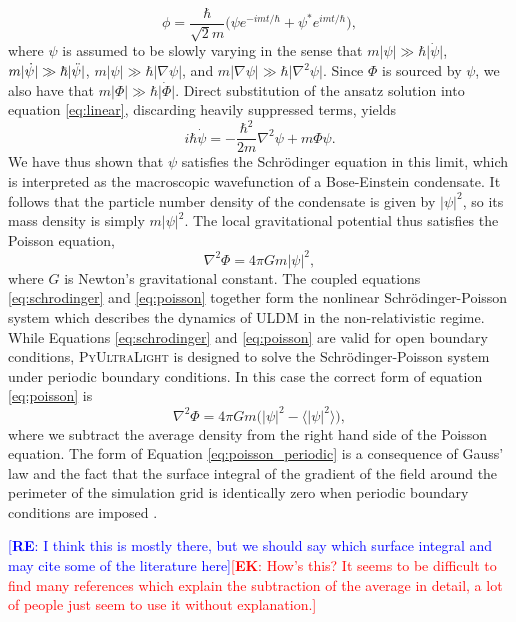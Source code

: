 \documentclass[a4paper,11pt]{article}
\newcommand{\re}[1]{\textcolor{blue}{[{\bf RE}: #1]}}
\newcommand{\ek}[1]{\textcolor{red}{[{\bf EK}: #1]}}
\newcommand{\PyUltraLight}{\textsc{PyUltraLight}\xspace}
\begin{document}
\begin{equation}\label{eq:ansatz}
    \phi=\frac{\hbar}{\sqrt{2}m}\big(\psi e^{-imt/\hbar}+\psi^* e^{imt/\hbar}\big),
\end{equation}
where $\psi$ is assumed to be slowly varying in the sense that $m\vert\psi\vert\gg\hbar\vert\dot{\psi}\vert$, $m\vert\dot{\psi}\vert\gg\hbar\vert\Ddot{\psi}\vert$, $m\vert\psi\vert\gg\hbar\vert\nabla{\psi}\vert$, and $m\vert\nabla{\psi}\vert\gg\hbar\vert\nabla^2{\psi}\vert$. Since $\Phi$ is sourced by $\psi$, we also have that $m\vert\Phi\vert\gg\hbar\vert\dot{\Phi}\vert$. Direct substitution of the ansatz solution into equation \ref{eq:linear}, discarding heavily suppressed terms, yields
\begin{equation}\label{eq:schrodinger}
    i\hbar\Dot{\psi}=-\frac{\hbar^2}{2m}\nabla^2\psi+m\Phi\psi.
\end{equation}
We have thus shown that $\psi$ satisfies the Schr{\"o}dinger equation in this limit, which is interpreted as the macroscopic wavefunction of a Bose-Einstein condensate. It follows that the particle number density of the condensate is given by $\vert\psi\vert^2$, so its mass density is simply $m\vert\psi\vert^2$. The local gravitational potential thus satisfies the Poisson equation,
\begin{equation}\label{eq:poisson}
    \nabla^2\Phi=4\pi G m \vert\psi\vert^2,
\end{equation}
where $G$ is Newton's gravitational constant. The coupled equations \ref{eq:schrodinger} and \ref{eq:poisson} together form the nonlinear Schr{\"o}dinger-Poisson system which describes the dynamics of ULDM in the non-relativistic regime. While Equations \ref{eq:schrodinger} and \ref{eq:poisson} are valid for open boundary conditions, \PyUltraLight is designed to solve the Schr{\"o}dinger-Poisson system under periodic boundary conditions. In this case the correct form of equation \ref{eq:poisson} is 
\begin{equation}\label{eq:poisson_periodic}
    \nabla^2\Phi=4\pi G m \big(\vert\psi\vert^2-\langle\vert\psi\vert^2\rangle\big),
\end{equation}
where we subtract the average density from the right hand side of the Poisson equation. The form of Equation \ref{eq:poisson_periodic} is a consequence of Gauss' law and the fact that the surface integral of the gradient of the field around the perimeter of the simulation grid is identically zero when periodic boundary conditions are imposed \cite{Dabo:2008}. 

\re{I think this is mostly there, but we should say which surface integral and may cite some of the literature here}\ek{How's this? It seems to be difficult to find many references which explain the subtraction of the average in detail, a lot of people just seem to use it without explanation.}
\end{document}
